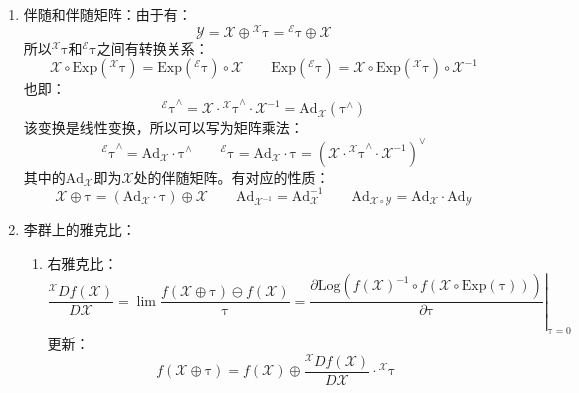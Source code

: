 \documentclass[12pt, onecolumn]{article}
\newcommand\liehat[1]{#1^{\land}}
\newcommand\lievee[1]{#1^\vee}
\newcommand\Exp[1]{\mathrm{Exp}\left( #1\right) }
\newcommand\Log[1]{\mathrm{Log}\left( #1\right) }
\newcommand\bsm[1]{\boldsymbol{\mathrm{#1}}}
\begin{document}
\begin{enumerate}
	\item 伴随和伴随矩阵：由于有：
	\begin{equation}
	\mathcal{Y}=\mathcal{X}\oplus{^\mathcal{X}\bsm\tau}={^\mathcal{E}\bsm\tau}\oplus\mathcal{X}
	\end{equation}
	所以${^\mathcal{X}\bsm\tau}$和${^\mathcal{E}\bsm\tau}$之间有转换关系：
	\begin{equation}
	\mathcal{X}\circ\Exp{{^\mathcal{X}\bsm\tau}}=\Exp{{^\mathcal{E}\bsm\tau}}\circ\mathcal{X}
	\qquad
	\Exp{{^\mathcal{E}\bsm\tau}}=\mathcal{X}\circ\Exp{{^\mathcal{X}\bsm\tau}}\circ\mathcal{X}^{-1}
	\end{equation}
	也即：
	\begin{equation}
	\liehat{{^\mathcal{E}\bsm\tau}}=\mathcal{X}\cdot\liehat{{^\mathcal{X}\bsm\tau}}\cdot\mathcal{X}^{-1}=\mathrm{Ad}_\mathcal{X}\left( \liehat{{\bsm\tau}}\right) 
	\end{equation}
	该变换是线性变换，所以可以写为矩阵乘法：
	\begin{equation}
	\liehat{{^\mathcal{E}\bsm\tau}}=\bsm{Ad}_\mathcal{X}\cdot\liehat{{\bsm\tau}}
	\qquad
	{^\mathcal{E}\bsm\tau}=\bsm{Ad}_\mathcal{X}\cdot{\bsm\tau}=
	\lievee{\left( \mathcal{X}\cdot\liehat{{^\mathcal{X}\bsm\tau}}\cdot\mathcal{X}^{-1}\right) }
	\end{equation}
	其中的$\bsm{Ad}_\mathcal{X}$即为$\mathcal{X}$处的伴随矩阵。有对应的性质：
	\begin{equation}
	\mathcal{X}\oplus\bsm{\tau}=(\bsm{Ad}_{\mathcal{X}}\cdot\bsm{\tau})\oplus\mathcal{X}
	\qquad
	\bsm{Ad}_{\mathcal{X}^{-1}}=\bsm{Ad}_{\mathcal{X}}^{-1}
	\qquad
	\bsm{Ad}_{\mathcal{X}\circ\mathcal{Y}}=\bsm{Ad}_{\mathcal{X}}\cdot\bsm{Ad}_{\mathcal{Y}}
	\end{equation}
	
	\item 李群上的雅克比：
	\begin{enumerate}
	\item 右雅克比：
	\begin{equation}
	\frac{{^\mathcal{X}Df(\mathcal{X})}}{D\mathcal{X}}
	=\lim\frac{f(\mathcal{X}\oplus\bsm{\tau})\ominus f(\mathcal{X})}{\bsm{\tau}}
	=\left. \frac{\partial \Log{f(\mathcal{X})^{-1}\circ f(\mathcal{X}\circ\Exp{\bsm\tau})}}{\partial \bsm{\tau}}\right|_{\bsm{\tau}=0}
	\end{equation}
	更新：
	\begin{equation}
	f(\mathcal{X}\oplus\bsm{\tau})=f(\mathcal{X})\oplus \frac{{^\mathcal{X}Df(\mathcal{X})}}{D\mathcal{X}}\cdot{^{\mathcal{X}}\bsm{\tau}}
	\end{equation}
	

\end{enumerate}
\end{enumerate}
\end{document}
